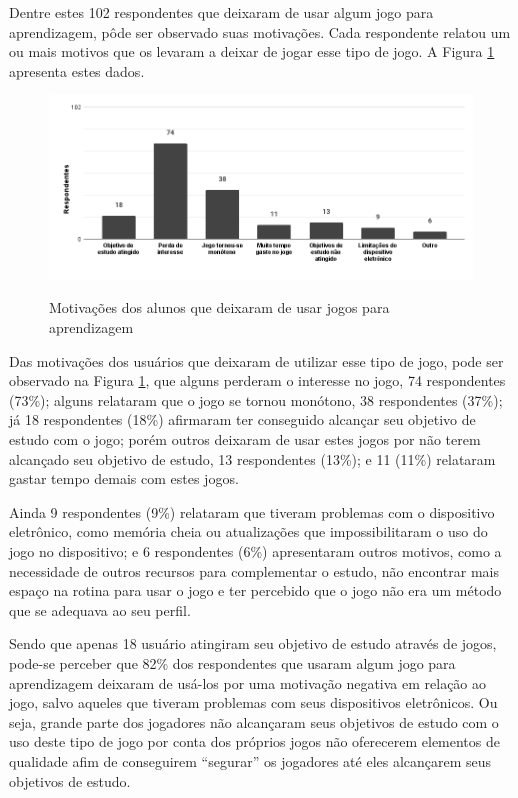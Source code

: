 Dentre estes 102 respondentes que deixaram de usar algum jogo para aprendizagem, pôde ser observado suas motivações. Cada respondente relatou um ou mais motivos que os levaram a deixar de jogar esse tipo de jogo. A Figura \ref{Fig:deixa-jogo.png} apresenta estes dados.

\begin{figure}[htbp]
	\centering
	\caption{Motivações dos alunos que deixaram de usar jogos para aprendizagem}
	\includegraphics[keepaspectratio=true,scale=0.5]{figuras/resultados/deixa-jogo.png}
	\label{Fig:deixa-jogo.png}
\end{figure}

Das motivações dos usuários que deixaram de utilizar esse tipo de jogo, pode ser observado na Figura \ref{Fig:deixa-jogo.png}, que alguns perderam o interesse no jogo, 74 respondentes (73\%); alguns relataram que o jogo se tornou monótono, 38 respondentes (37\%); já 18 respondentes (18\%) afirmaram ter conseguido alcançar seu objetivo de estudo com o jogo; porém outros deixaram de usar estes jogos por não terem alcançado seu objetivo de estudo, 13 respondentes (13\%); e 11 (11\%) relataram gastar tempo demais com estes jogos.

Ainda 9 respondentes (9\%) relataram que tiveram problemas com o dispositivo eletrônico, como memória cheia ou atualizações que impossibilitaram o uso do jogo no dispositivo; e 6 respondentes (6\%) apresentaram outros motivos, como a necessidade de outros recursos para complementar o estudo, não encontrar mais espaço na rotina para usar o jogo e ter percebido que o jogo não era um método que se adequava ao seu perfil.

Sendo que apenas 18 usuário atingiram seu objetivo de estudo através de jogos, pode-se perceber que 82\% dos respondentes que usaram algum jogo para aprendizagem deixaram de usá-los por uma motivação negativa em relação ao jogo, salvo aqueles que tiveram problemas com seus dispositivos eletrônicos. Ou seja, grande parte dos jogadores não alcançaram seus objetivos de estudo com o uso deste tipo de jogo por conta dos próprios jogos não oferecerem elementos de qualidade afim de conseguirem ``segurar'' os jogadores até eles alcançarem seus objetivos de estudo. 

